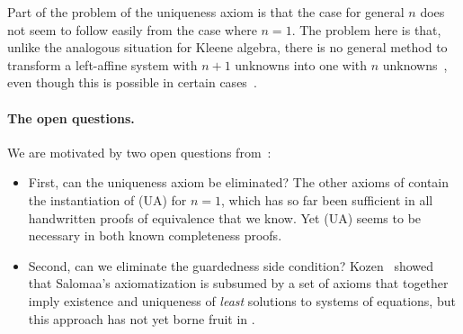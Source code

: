 \documentclass[orivec,envcountsect,envcountsame]{llncs}
\begin{document}


    \begin{remark}
    Part of the problem of the uniqueness axiom is that the case for general $n$ does not seem to follow easily from the case where $n = 1$.
    The problem here is that, unlike the analogous situation for Kleene algebra, there is no general method to transform a left-affine system with $n+1$ unknowns into one with $n$ unknowns~\cite{kozentseng}, even though this is possible in certain cases~\cite{gkatpopl}.
    \end{remark}


   \paragraph{\bf The open questions.}
   We are motivated by two open questions from~\cite{gkatpopl}:
%
    \begin{itemize}
        \item
        First, can the uniqueness axiom be eliminated?
        The other axioms of \GKAT contain the instantiation of (\textsf{UA}) for $n = 1$, which has so far been sufficient in all handwritten proofs of equivalence that we know.
        Yet (\textsf{UA}) seems to be necessary in both known completeness proofs.

        \item
        Second, can we eliminate the guardedness side condition?
        Kozen~\cite{kozen} showed that Salomaa's axiomatization is subsumed by a set of axioms that together imply existence and uniqueness of \emph{least} solutions to systems of equations, but this approach has not yet borne fruit in \GKAT. %
    \end{itemize}
%
\end{document}
